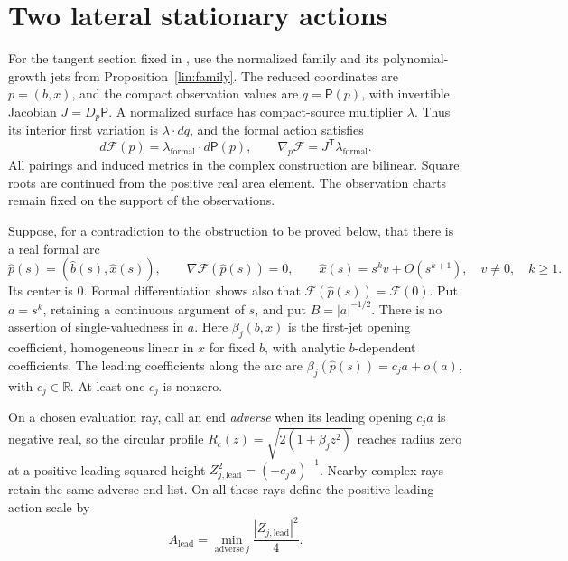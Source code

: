 \section{Two lateral stationary actions}\label{sec:arrays}

For the tangent section fixed in , use the normalized
family and its polynomial-growth jets from Proposition~\ref{lin:family}.
The reduced coordinates are \(p=(b,x)\),
and the compact observation values are \(q=\mathsf P(p)\), with
invertible Jacobian \(J=D_p\mathsf P\).  A normalized surface has
compact-source multiplier \(\lambda\).  Thus its interior first
variation is \(\lambda\cdot dq\), and the formal action satisfies
\[
 d\mathcal F(p)=\lambda_{\mathrm{formal}}\cdot d\mathsf P(p),
 \qquad \nabla_p\mathcal F=J^{\mathsf T}\lambda_{\mathrm{formal}}.
\]
All pairings and induced metrics in the complex construction are
bilinear.  Square roots are continued from the positive real area
element.  The observation charts remain fixed on the support of the
observations.

Suppose, for a contradiction to the obstruction to be proved below,
that there is a real formal arc
\begin{equation}\label{arr:critical-arc}
 \widehat p(s)=(\widehat b(s),\widehat x(s)),\qquad
 \nabla\mathcal F(\widehat p(s))=0,\qquad
 \widehat x(s)=s^k v+O(s^{k+1}),\quad v\ne0,\quad k\ge1.
\end{equation}
Its center is \(0\).  Formal differentiation shows also that
\(\mathcal F(\widehat p(s))=\mathcal F(0)\).
Put \(a=s^k\), retaining a continuous argument of \(s\), and put
\(B=|a|^{-1/2}\).  There is no assertion of single-valuedness in \(a\).
Here \(\beta_j(b,x)\) is the first-jet opening coefficient,
homogeneous linear in \(x\) for fixed \(b\), with analytic
\(b\)-dependent coefficients.  The leading coefficients along the arc are
\(\beta_j(\widehat p(s))=c_j a+o(a)\), with \(c_j\in\mathbb R\).
At least one \(c_j\) is nonzero.

On a chosen evaluation ray, call an end \emph{adverse} when its
leading opening \(c_j a\) is negative real, so the circular profile
\(R_c(z)=\sqrt{2(1+\beta_j z^2)}\) reaches radius zero at a
positive leading squared height \(Z_{j,\mathrm{lead}}^2=(-c_j a)^{-1}\).
Nearby complex rays retain the same adverse end list.  On all these
rays define the positive leading action scale by
\begin{equation}\label{arr:A0}
 A_{\mathrm{lead}}
   =\min_{\mathrm{adverse}\ j}\frac{|Z_{j,\mathrm{lead}}|^2}{4}.
\end{equation}

